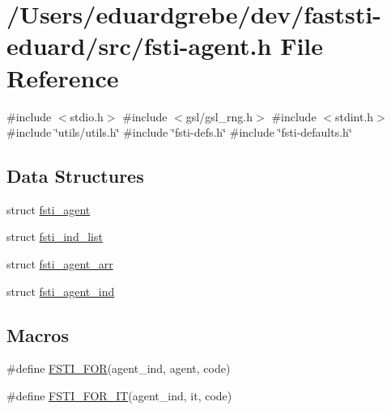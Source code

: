 \hypertarget{fsti-agent_8h}{}\section{/\+Users/eduardgrebe/dev/faststi-\/eduard/src/fsti-\/agent.h File Reference}
\label{fsti-agent_8h}
{\ttfamily \#include $<$stdio.\+h$>$}\newline
{\ttfamily \#include $<$gsl/gsl\+\_\+rng.\+h$>$}\newline
{\ttfamily \#include $<$stdint.\+h$>$}\newline
{\ttfamily \#include \char`\"{}utils/utils.\+h\char`\"{}}\newline
{\ttfamily \#include \char`\"{}fsti-\/defs.\+h\char`\"{}}\newline
{\ttfamily \#include \char`\"{}fsti-\/defaults.\+h\char`\"{}}\newline
\subsection*{Data Structures}
\begin{DoxyCompactItemize}
\item 
struct \mbox{\hyperlink{structfsti__agent}{fsti\+\_\+agent}}
\item 
struct \mbox{\hyperlink{structfsti__ind__list}{fsti\+\_\+ind\+\_\+list}}
\item 
struct \mbox{\hyperlink{structfsti__agent__arr}{fsti\+\_\+agent\+\_\+arr}}
\item 
struct \mbox{\hyperlink{structfsti__agent__ind}{fsti\+\_\+agent\+\_\+ind}}
\end{DoxyCompactItemize}
\subsection*{Macros}
\begin{DoxyCompactItemize}
\item 
\#define \mbox{\hyperlink{fsti-agent_8h_a4c03aa904df401cdd442c95af046e217}{F\+S\+T\+I\+\_\+\+F\+OR}}(agent\+\_\+ind,  agent,  code)
\item 
\#define \mbox{\hyperlink{fsti-agent_8h_a9cdc0f2e5160a06cdbbbd9a0807513f5}{F\+S\+T\+I\+\_\+\+F\+O\+R\+\_\+\+IT}}(agent\+\_\+ind,  it,  code)
\end{DoxyCompactItemize}
